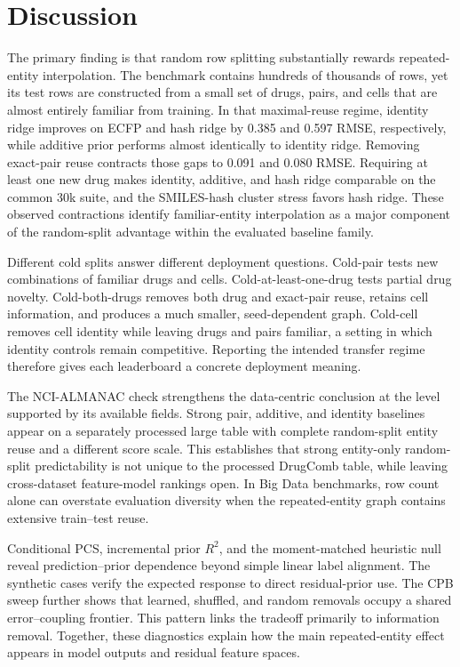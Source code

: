 \documentclass[conference]{IEEEtran}
\begin{document}
\section{Discussion}

The primary finding is that random row splitting substantially rewards repeated-entity interpolation. The benchmark contains hundreds of thousands of rows, yet its test rows are constructed from a small set of drugs, pairs, and cells that are almost entirely familiar from training. In that maximal-reuse regime, identity ridge improves on ECFP and hash ridge by 0.385 and 0.597 RMSE, respectively, while additive prior performs almost identically to identity ridge. Removing exact-pair reuse contracts those gaps to 0.091 and 0.080 RMSE. Requiring at least one new drug makes identity, additive, and hash ridge comparable on the common 30k suite, and the SMILES-hash cluster stress favors hash ridge. These observed contractions identify familiar-entity interpolation as a major component of the random-split advantage within the evaluated baseline family.

Different cold splits answer different deployment questions. Cold-pair tests new combinations of familiar drugs and cells. Cold-at-least-one-drug tests partial drug novelty. Cold-both-drugs removes both drug and exact-pair reuse, retains cell information, and produces a much smaller, seed-dependent graph. Cold-cell removes cell identity while leaving drugs and pairs familiar, a setting in which identity controls remain competitive. Reporting the intended transfer regime therefore gives each leaderboard a concrete deployment meaning.

The NCI-ALMANAC check strengthens the data-centric conclusion at the level supported by its available fields. Strong pair, additive, and identity baselines appear on a separately processed large table with complete random-split entity reuse and a different score scale. This establishes that strong entity-only random-split predictability is not unique to the processed DrugComb table, while leaving cross-dataset feature-model rankings open. In Big Data benchmarks, row count alone can overstate evaluation diversity when the repeated-entity graph contains extensive train--test reuse.

Conditional PCS, incremental prior $R^2$, and the moment-matched heuristic null reveal prediction--prior dependence beyond simple linear label alignment. The synthetic cases verify the expected response to direct residual-prior use. The CPB sweep further shows that learned, shuffled, and random removals occupy a shared error--coupling frontier. This pattern links the tradeoff primarily to information removal. Together, these diagnostics explain how the main repeated-entity effect appears in model outputs and residual feature spaces.
\end{document}
